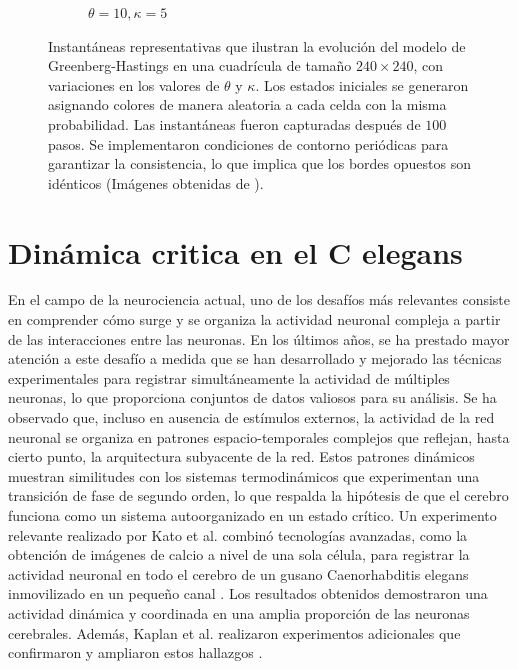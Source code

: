 \begin{figure}[h!]
\begin{subfigure}{0.45\linewidth}
		\caption{$\theta=10,\kappa=5$}
		\label{fig:ghd}
	\end{subfigure}
	\caption[Instantáneas representativas que ilustran la evolución del modelo de Greenberg-Hastings en una cuadrícula de tamaño $240\times240$, con variaciones en los valores de $\theta$ y $\kappa$. ]{Instantáneas representativas que ilustran la evolución del modelo de Greenberg-Hastings en una cuadrícula de tamaño $240\times240$, con variaciones en los valores de $\theta$ y $\kappa$. Los estados iniciales se generaron asignando colores de manera aleatoria a cada celda con la misma probabilidad. Las instantáneas fueron capturadas después de $100$ pasos. Se implementaron condiciones de contorno periódicas para garantizar la consistencia, lo que implica que los bordes opuestos son idénticos (Imágenes obtenidas de \protect\cite{durrett_asymptotic_1993}).}
	\label{fig:gh}
\end{figure}





\section{Dinámica critica en el C elegans}

En el campo de la neurociencia actual, uno de los desafíos más relevantes consiste en comprender cómo surge y se organiza la actividad neuronal compleja a partir de las interacciones entre las neuronas. En los últimos años, se ha prestado mayor atención a este desafío a medida que se han desarrollado y mejorado las técnicas experimentales para registrar simultáneamente la actividad de múltiples neuronas, lo que proporciona conjuntos de datos valiosos para su análisis. Se ha observado que, incluso en ausencia de estímulos externos, la actividad de la red neuronal se organiza en patrones espacio-temporales complejos que reflejan, hasta cierto punto, la arquitectura subyacente de la red. Estos patrones dinámicos muestran similitudes con los sistemas termodinámicos que experimentan una transición de fase de segundo orden, lo que respalda la hipótesis de que el cerebro funciona como un sistema autoorganizado en un estado crítico. Un experimento relevante realizado por Kato et al. combinó tecnologías avanzadas, como la obtención de imágenes de calcio a nivel de una sola célula, para registrar la actividad neuronal en todo el cerebro de un  gusano Caenorhabditis elegans  inmovilizado  en un pequeño canal \cite{kato_global_2015}.  Los resultados obtenidos demostraron una actividad dinámica y coordinada en una amplia proporción de las neuronas cerebrales. Además, Kaplan et al. realizaron experimentos adicionales que confirmaron y ampliaron estos hallazgos  \cite{kaplan_nested_2020}.


